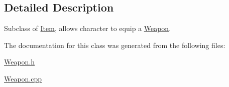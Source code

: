 \subsection{Detailed Description}
Subclass of \hyperlink{class_item}{Item}, allows character to equip a \hyperlink{class_weapon}{Weapon}. 

The documentation for this class was generated from the following files\+:\begin{DoxyCompactItemize}
\item 
\hyperlink{_weapon_8h}{Weapon.\+h}\item 
\hyperlink{_weapon_8cpp}{Weapon.\+cpp}\end{DoxyCompactItemize}
